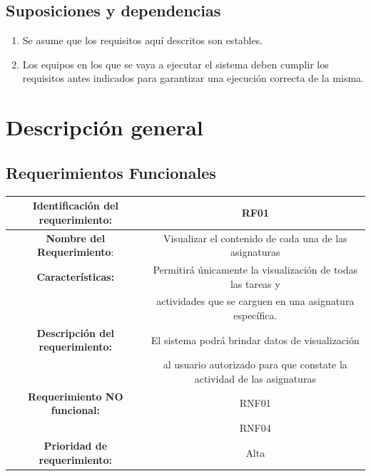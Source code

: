 \documentclass[11pt]{article}
\begin{document}
\subsection{\textbf{Suposiciones y dependencias}}
\begin{enumerate}
\item Se asume que los requisitos aquí descritos son estables.
\item Los equipos en los que se vaya a ejecutar el sistema deben
cumplir los requisitos antes indicados para garantizar una ejecución
correcta de la misma.
\end{enumerate}

\section{\textbf{Descripción general}}

\subsection{\textbf{Requerimientos Funcionales}}


\vspace{15pt}

\begin{tabular}{|c|c|} 
\hline
\textbf{Identificación del requerimiento:} & RF01  \\
\hline
\textbf{Nombre del Requerimiento}: & Visualizar el contenido de cada 
una de las asignaturas \\
\hline
\textbf{Características:} & Permitirá únicamente la visualización de 
todas las tareas y \\ & actividades que se carguen en una asignatura
específica.  \\
\hline
\textbf{Descripción del requerimiento:} & El sistema podrá brindar 
datos de visualización\\ & al usuario autorizado para que constate 
la actividad de las asignaturas \\
\hline
\textbf{Requerimiento NO funcional:} & RNF01 \\
& RNF04  \\
\hline
\textbf{Prioridad de requerimiento:} & Alta \\
\hline

\end{tabular}



\vspace{15pt}
\end{document}
